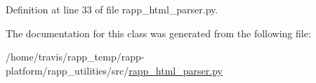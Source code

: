 Definition at line 33 of file rapp\-\_\-html\-\_\-parser.\-py.



The documentation for this class was generated from the following file\-:\begin{DoxyCompactItemize}
\item 
/home/travis/rapp\-\_\-temp/rapp-\/platform/rapp\-\_\-utilities/src/\hyperlink{rapp__html__parser_8py}{rapp\-\_\-html\-\_\-parser.\-py}\end{DoxyCompactItemize}
